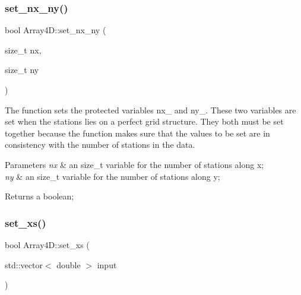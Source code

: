 \mbox{\label{class_array4_d_a4071001d8fd5248bcaf89c54556a6fe2}} 
\subsubsection{\texorpdfstring{set\+\_\+nx\+\_\+ny()}{set\_nx\_ny()}}
{\footnotesize\ttfamily bool Array4\+D\+::set\+\_\+nx\+\_\+ny (\begin{DoxyParamCaption}\item[{size\+\_\+t}]{nx,  }\item[{size\+\_\+t}]{ny }\end{DoxyParamCaption})}

The function sets the protected variables nx\+\_\+ and ny\+\_\+. These two variables are set when the stations lies on a perfect grid structure. They both must be set together because the function makes sure that the values to be set are in consistency with the number of stations in the data.


\begin{DoxyParams}{Parameters}
{\em nx} & an size\+\_\+t variable for the number of stations along x; \\
\hline
{\em ny} & an size\+\_\+t variable for the number of stations along y; \\
\hline
\end{DoxyParams}
\begin{DoxyReturn}{Returns}
a boolean; 
\end{DoxyReturn}
\mbox{\label{class_array4_d_a92afa660eb005779a0c2cf602aa4c6fe}} 
\subsubsection{\texorpdfstring{set\+\_\+xs()}{set\_xs()}}
{\footnotesize\ttfamily bool Array4\+D\+::set\+\_\+xs (\begin{DoxyParamCaption}\item[{std\+::vector$<$ double $>$}]{input }\end{DoxyParamCaption})}

\mbox{\label{class_array4_d_a03ed88518d6991a55f3e48ad7de15d73}} 
